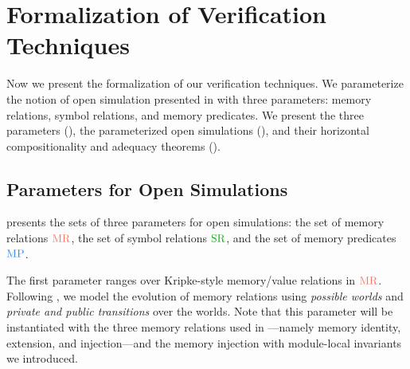 \chapter{\;\;\;\;Formalization of Verification Techniques}
\label{sec:main-verification}


Now we present the formalization of our verification techniques.
We parameterize the notion of open simulation presented in
 with three parameters: memory relations, symbol
relations, and memory predicates.  We present the three parameters
(), the parameterized open simulations
(), and their horizontal compositionality and adequacy theorems
().

\section{Parameters for Open Simulations}
\label{sec:main-verification:parameter}

 presents
the sets of three parameters for open simulations:
the set of memory relations $\MREL$, the set of symbol relations $\SREL$, and the set of memory predicates $\MPRED$.




The first parameter ranges over Kripke-style memory/value relations in $\MREL$.
Following \cite{DBLP:conf/icfp/DreyerNB10,pb}, we model the
evolution of memory relations using \emph{possible worlds} and \emph{private and public transitions}
over the worlds.
Note that this parameter will be instantiated with the three memory relations used in \cc{}---namely memory
identity, extension, and injection---and the memory injection with module-local invariants we introduced.

